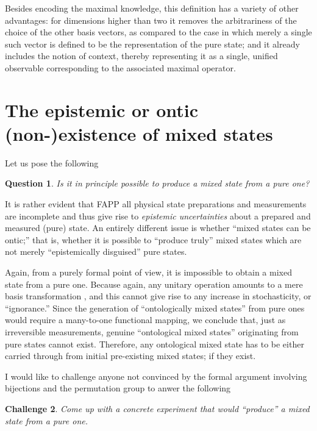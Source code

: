 \documentclass[%
  preprint,
 showpacs,
 showkeys,
 preprintnumbers,
 amsmath,amssymb,
 aps,
   pra,
  longbibliography,
 ]{revtex4-1}
\newtheorem{question}{Question}
\newtheorem{challenge}[question]{Challenge}
\begin{document}
Besides encoding the maximal knowledge, this definition has a variety of other advantages:
for dimensions higher than two it removes the arbitrariness of the choice of the other basis vectors, as compared to the
case in which merely a single such vector is defined to be the representation of the pure state;
and it already includes the notion of context, thereby representing it as a single, unified observable
corresponding to the associated maximal operator.


\section{The epistemic or ontic (non-)existence of mixed states}

Let us pose the following
{\color{blue} \begin{question}
Is it in principle possible to produce a mixed state from a pure one?
\end{question}   }

It is rather evident that FAPP all physical state preparations and measurements are incomplete and thus give rise to
{\em epistemic uncertainties} about a prepared and measured (pure) state.
An entirely different issue is whether ``mixed states can be ontic;'' that is,
whether it is possible to ``produce truly'' mixed states which
are not merely ``epistemically disguised'' pure states.

Again, from a purely formal point of view,
it is impossible to obtain a mixed state from a pure one.
Because again, any unitary operation amounts to a mere basis transformation \cite{Schwinger.60},
and this cannot give rise to any increase in stochasticity,  or ``ignorance.''
Since the generation of ``ontologically mixed states'' from pure ones would require a many-to-one functional mapping,
we conclude that, just as irreversible measurements, genuine ``ontological mixed states'' originating from pure states cannot exist.
Therefore, any ontological mixed state has to be either carried through from initial pre-existing mixed states; if they exist.


I would like to challenge anyone not convinced by the formal argument involving bijections and the permutation group
to anwer the following
{\color{blue} \begin{challenge}
Come
up with a concrete experiment that would ``produce'' a mixed state from a pure one.
\end{challenge}
}
\end{document}

